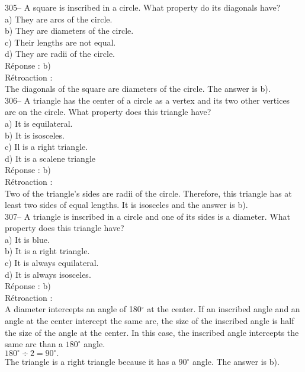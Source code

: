 \documentclass[letterpaper, 12pt]{article}
\begin{document}
305-- A square is inscribed in a circle. What property do its diagonals have?\\

a) They are arcs of the circle.\\
b) They are diameters of the circle.\\
c) Their lengths are not equal.\\
d) They are radii of the circle.\\

R\'eponse : b)\\

R\'etroaction :\\
The diagonals of the square are diameters of the circle. The answer is b).\\

306-- A triangle has the center of a circle as a vertex and its two other vertices are on the circle. What property does this triangle have?\\

a) It is equilateral.\\
b) It is isosceles.\\
c) Il is a right triangle.\\
d) It is a scalene triangle\\

R\'eponse : b)\\

R\'etroaction :\\
Two of the triangle's sides are radii of the circle. Therefore, this triangle has at least two sides of equal lengths. It is isosceles and the answer is b).\\

307-- A triangle is inscribed in a circle and one of its sides is a diameter. What property does this triangle have?\\

a) It is blue.\\
b) It is a right triangle.\\
c) It is always equilateral.\\
d) It is always isosceles.\\

R\'eponse : b)\\

R\'etroaction :\\
A diameter intercepts an angle of 180$^{\circ}$ at the center. If an inscribed angle and an angle at the center intercept the same arc,
the size of the inscribed angle is half the size of the angle at the center. In this case, the inscribed angle intercepts the same arc than a $180^{\circ}$ angle.\\
$180^{\circ}\div2=90^{\circ}.$\\
The triangle is a right triangle because it has a $90^{\circ}$ angle. The answer is b).\\
\end{document}
